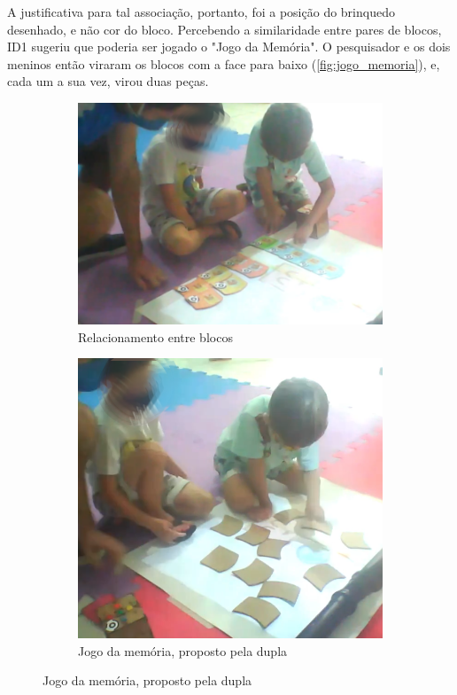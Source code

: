 A justificativa para tal associação, portanto, foi a posição do brinquedo desenhado, e não cor do bloco. Percebendo a similaridade entre pares de blocos, ID1 sugeriu que poderia ser jogado o "Jogo da Memória". O pesquisador e os dois meninos então viraram os blocos com a face para baixo (\autoref{fig:jogo_memoria}), e, cada um a sua vez, virou duas peças.

\begin{figure}[!htbp]
    \begin{center}
    \begin{subfigure}{.5\textwidth}
        \centering
        \includegraphics[width=.9\linewidth,fbox]{figs/relacao_blocos.png}
        \caption{Relacionamento entre blocos}
        \label{fig:relacao_blocos}
    \end{subfigure}%
    \begin{subfigure}{.4\textwidth}
        \centering
        \includegraphics[width=.9\linewidth,fbox]{figs/jogo_memoria.png}
        \caption{Jogo da memória, proposto pela dupla}
        \label{fig:jogo_memoria}
    \end{subfigure}
    \end{center}
    \sourceauthor
    \label{fig:equipe1}
\end{figure}

